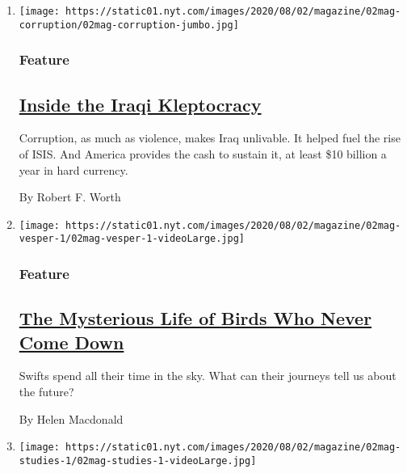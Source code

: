 \begin{enumerate}
\def\labelenumi{\arabic{enumi}.}
\item
  \texttt{[image: https://static01.nyt.com/images/2020/08/02/magazine/02mag-corruption/02mag-corruption-jumbo.jpg]}

  \hypertarget{feature}{%
  \subsubsection{Feature}\label{feature}}

  \hypertarget{inside-the-iraqi-kleptocracy}{%
  \subsection{\texorpdfstring{\href{/2020/07/29/magazine/iraq-corruption.html}{Inside
  the Iraqi
  Kleptocracy}}{Inside the Iraqi Kleptocracy}}\label{inside-the-iraqi-kleptocracy}}

  Corruption, as much as violence, makes Iraq unlivable. It helped fuel
  the rise of ISIS. And America provides the cash to sustain it, at
  least \$10 billion a year in hard currency.

  By Robert F. Worth
\item
  \texttt{[image: https://static01.nyt.com/images/2020/08/02/magazine/02mag-vesper-1/02mag-vesper-1-videoLarge.jpg]}

  \hypertarget{feature-1}{%
  \subsubsection{Feature}\label{feature-1}}

  \hypertarget{the-mysterious-life-of-birds-who-never-come-down}{%
  \subsection{\texorpdfstring{\href{/2020/07/29/magazine/vesper-flights.html}{The
  Mysterious Life of Birds Who Never Come
  Down}}{The Mysterious Life of Birds Who Never Come Down}}\label{the-mysterious-life-of-birds-who-never-come-down}}

  Swifts spend all their time in the sky. What can their journeys tell
  us about the future?

  By Helen Macdonald
\item
  \texttt{[image: https://static01.nyt.com/images/2020/08/02/magazine/02mag-studies-1/02mag-studies-1-videoLarge.jpg]}

  \hypertarget{studies-show}{%
}
\end{enumerate}
